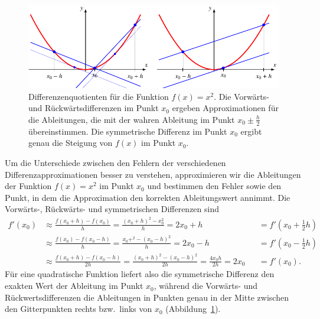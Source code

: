 \begin{beispiel}
\begin{figure}
\centering
\includegraphics{chapters/70-pde/images/diffex.pdf}
\caption{Differenzenquotienten für die Funktion $f(x)=x^2$.
Die Vorwärts- und Rückwärtsdifferenzen im Punkt $x_0$ ergeben Approximationen
für die Ableitungen, die mit der wahren Ableitung im Punkt $x_0\pm \frac{h}2$
übereinstimmen.
Die symmetrische Differenz im Punkt $x_0$ ergibt genau die Steigung von $f(x)$
im Punkt $x_0$.
\label{buch:pde:diffex}}
\end{figure}
Um die Unterschiede zwischen den Fehlern der verschiedenen
Differenzapproximationen besser zu verstehen, approximieren wir die
Ableitungen der Funktion $f(x)=x^2$ im Punkt $x_0$ und bestimmen den
Fehler sowie den Punkt, in dem die Approximation den korrekten Ableitungswert
annimmt.
Die Vorwärts-, Rückwärts- und symmetrischen Differenzen sind
\begin{align*}
f'(x_0)
&\approx
\frac{f(x_0+h)-f(x_0)}{h}
=
\frac{(x_0+h)^2-x_0^2}{h}
=
2x_0+h
&&=
f'(x_0 + {\textstyle\frac12}h)
\\
&\approx
\frac{f(x_0)-f(x_0-h)}{h}
=
\frac{x_0+^2-(x_0-h)^2}{h}
=
2x_0-h
&&=
f'(x_0 - {\textstyle\frac12}h)
\\
&\approx
\frac{f(x_0+h)-f(x_0-h)}{2h}
=
\frac{(x_0+h)^2-(x_0-h)^2}{2h}
=
\frac{4x_0h}{2h}=2x_0
&&=
f'(x_0).
\end{align*}
Für eine quadratische Funktion liefert also die symmetrische Differenz
den exakten Wert der Ableitung im Punkt $x_0$, während die Vorwärts-
und Rückwertsdifferenzen die Ableitungen in Punkten genau in der Mitte
zwischen den Gitterpunkten rechts bzw.~links von $x_0$
(Abbildung~\ref{buch:pde:diffex}).
\end{beispiel}

